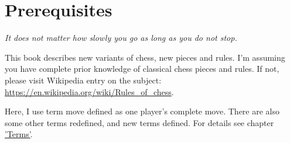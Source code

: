 

\chapter*{Prerequisites}

\begin{flushright}
\parbox{0.7\textwidth}{
\emph{It does not matter how slowly you go as long as you do not stop. \\
 } }
\end{flushright}

\noindent
This book describes new variants of chess, new pieces and rules. I'm assuming you have complete prior
knowledge of classical chess pieces and rules. If not, please visit Wikipedia entry on the subject: \\
\href{https://en.wikipedia.org/wiki/Rules\_of\_chess}{https://en.wikipedia.org/wiki/Rules\_of\_chess}.

Here, I use term move defined as one player's complete move. There are also some other terms redefined,
and new terms defined. For details see chapter \hyperref[ch:Terms]{'Terms'}.

\clearpage %
